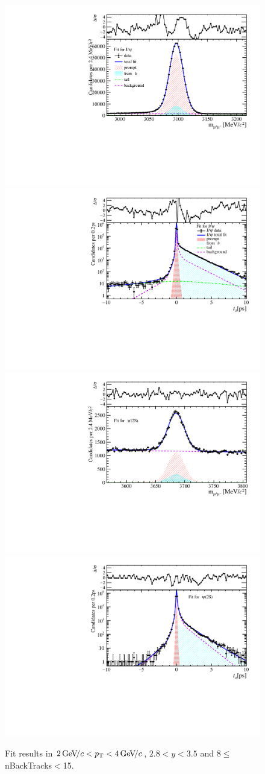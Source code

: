 \begin{figure}[H]
\begin{center}
\includegraphics[width=0.47\linewidth]{pdf/Jpsi/drawmassB/n2y2pt2.pdf}
\includegraphics[width=0.47\linewidth]{pdf/Jpsi/2DFitB/n2y2pt2.pdf}
\vspace*{-0.5cm}
\includegraphics[width=0.47\linewidth]{pdf/Psi2S/drawmassB/n2y2pt2.pdf}
\includegraphics[width=0.47\linewidth]{pdf/Psi2S/2DFitB/n2y2pt2.pdf}
\vspace*{-0.5cm}
\end{center}
\caption{Fit results in $2\text{\,Ge\kern -0.1em V\!/}c<p_{\mathrm{T}}<4\text{\,Ge\kern -0.1em V\!/}c$, $2.8<y<3.5$ and 8$\leq$nBackTracks$<$15.}
\label{Fitn2y2pt2}
\end{figure}
